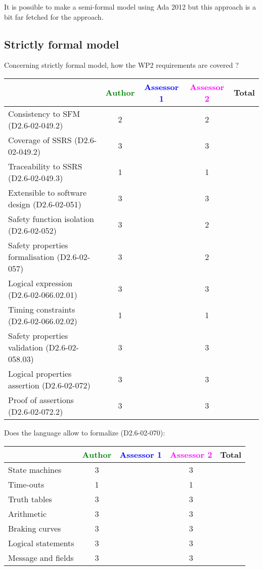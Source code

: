 It is possible to make a semi-formal model using Ada 2012 but this
approach is a bit far fetched for the approach.

\subsection{Strictly formal model}

Concerning strictly formal model, how the WP2 requirements are covered ?

\begin{tabular}{|l | c | c | c | c|}
\hline
& \textcolor{green}{Author} & \textcolor{blue}{Assessor 1} & \textcolor{magenta}{Assessor 2} & Total \\
\hline 
Consistency to SFM (D2.6-02-049.2) & 2 & & 2 &  \\
\hline
Coverage of SSRS (D2.6-02-049.2)  & 3 & & 3 &  \\
\hline
Traceability to  SSRS (D2.6-02-049.3)  & 1 & & 1 &  \\
\hline
Extensible to software design (D2.6-02-051)  & 3 & & 3 &  \\
\hline
Safety function isolation (D2.6-02-052)  & 3 & & 2 &  \\
\hline 
Safety properties formalisation (D2.6-02-057)  & 3 & & 2 &  \\
\hline
Logical expression (D2.6-02-066.02.01)  & 3 & & 3 &  \\
\hline
Timing constraints (D2.6-02-066.02.02)  & 1 & & 1 &  \\
\hline
Safety properties validation (D2.6-02-058.03)  & 3 & & 3 &  \\
\hline
Logical properties assertion (D2.6-02-072)  & 3 & & 3 &  \\
\hline
Proof of assertions (D2.6-02-072.2)  & 3 & & 3 &  \\
\hline
\end{tabular}

Does the language allow to  formalize (D2.6-02-070):

\begin{tabular}{|l | c | c | c | c|}
\hline
& \textcolor{green}{Author} & \textcolor{blue}{Assessor 1} & \textcolor{magenta}{Assessor 2} & Total \\
\hline 
State machines  & 3 & & 3 &  \\
\hline
Time-outs  & 1 & & 1 &  \\
\hline
Truth tables  & 3 & & 3 &  \\
\hline
Arithmetic  & 3 & & 3 &  \\
\hline
Braking curves  & 3 & & 3 &  \\
\hline
Logical statements & 3 & & 3 &  \\
\hline
Message and fields & 3 & & 3 &  \\
\hline
\end{tabular}

